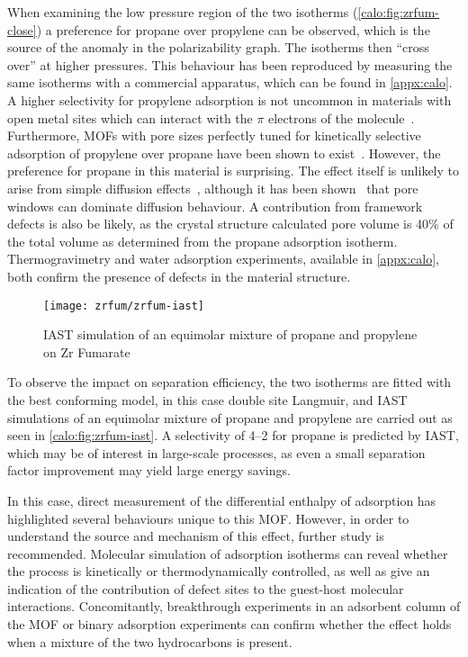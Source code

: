 When examining the low pressure region of the two isotherms 
(\autoref{calo:fig:zrfum-close}) a preference for propane over
propylene can be observed, which is the source of the anomaly
in the polarizability graph. The isotherms then ``cross over'' 
at higher pressures.
This behaviour has been reproduced by measuring the same 
isotherms with a commercial apparatus, which can be found 
in \autoref{appx:calo}.
A higher selectivity for propylene adsorption is not uncommon
in materials with open metal sites which can interact with 
the \(\pi\) electrons of the 
molecule~\cite{rubesAdsorptionPropanePropylene2013}.
Furthermore, \glspl{MOF} with pore sizes perfectly tuned for kinetically
selective adsorption of propylene over propane have been shown 
to exist~\cite{leeKineticSeparationPropene2011}. However,
the preference for propane in this material is surprising.
The effect itself is unlikely to arise from simple diffusion
effects~\cite{granatoDiffusionPropanePropylene2010}, although
it has been shown~\cite{combarizaPropanePropyleneDiffusion2009}
that pore windows can dominate diffusion behaviour. A contribution
from framework defects is also be likely, as the 
crystal structure calculated pore volume is 40\% of the total
volume as determined from the propane adsorption isotherm.
Thermogravimetry and water adsorption experiments, available in 
\autoref{appx:calo}, both confirm the presence of defects in the 
material structure.

\begin{figure}[htb]
    \centering
    \texttt{[image: zrfum/zrfum-iast]}
    \caption{IAST simulation of an equimolar mixture of 
    propane and propylene on Zr Fumarate}%
    \label{calo:fig:zrfum-iast}

\end{figure}

To observe the impact on separation efficiency, the two isotherms 
are fitted with the best conforming model, in this case
double site Langmuir, and \gls{IAST} simulations of an equimolar mixture
of propane and propylene are carried out as seen in 
\autoref{calo:fig:zrfum-iast}. A selectivity of 4--2 for 
propane is predicted by \gls{IAST}, which may be of interest in 
large-scale processes, as even a small separation factor 
improvement may yield large energy savings.

In this case, direct measurement of the differential enthalpy of 
adsorption has highlighted several behaviours unique to this 
\gls{MOF}. However, in order to understand the source and mechanism
of this effect, further study is recommended. Molecular 
simulation of adsorption isotherms can reveal whether 
the process is kinetically or thermodynamically controlled, as well
as give an indication of the contribution of defect sites to the
guest-host molecular interactions.
Concomitantly, breakthrough experiments in an adsorbent column of 
the \gls{MOF} or binary adsorption experiments can confirm whether the 
effect holds when a mixture of the two hydrocarbons is present.